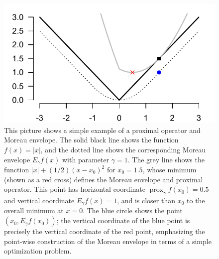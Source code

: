 \documentclass[11 pt]{article}
\newcommand{\prox}{ \mathop{\mathrm{prox}} }
\begin{document}
	\begin{figure}[H]
		\begin{center}
		\includegraphics[width=0.53\linewidth]{moreau_envelope.pdf}
		\caption{\small This picture shows a simple example of a proximal operator and Moreau envelope.  The solid black line shows the function $f(x) = |x|$, and the dotted line shows the corresponding Moreau envelope $E_{\gamma} f (x)$ with parameter $\gamma=1$.  The grey line shows the function 
			$|x| + (1/2)(x-x_0)^2$ for $x_0 = 1.5$, whose minimum (shown as a red cross)
			defines the Moreau envelope and proximal operator.  This point has horizontal coordinate
			$\prox_\gamma f(x_0) = 0.5$ and vertical coordinate $E_{\gamma} f (x) = 1$, and is closer than $x_0$
			to the overall minimum at $x=0$.  The blue circle shows the point 
			$(x_0, E_{\gamma} f (x_0))$; the vertical coordinate of the blue point is precisely the vertical coordinate of the red point, emphasizing the point-wise construction of the Moreau
			envelope in terms of a simple optimization problem.
		}
	\end{center}
	\end{figure}
	
\end{document}
